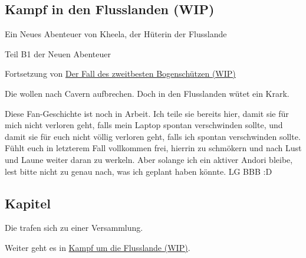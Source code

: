 \begin{chapterbox}
    \chapter{Kampf in den Flusslanden (WIP)}
    \label{wip-kampf-in-den-flusslanden}
    
    \begin{center}
        Ein Neues Abenteuer von Kheela, der Hüterin der Flusslande

        Teil B1 der Neuen Abenteuer

        Fortsetzung von \hyperref[wip-der-fall-des-zweitbesten-bogenschuetzen]{Der Fall des zweitbesten Bogenschützen (WIP)}
    \end{center}

    Die  wollen nach Cavern aufbrechen. Doch in den Flusslanden wütet ein Krark.
\end{chapterbox}




Diese Fan-Geschichte ist noch in Arbeit. Ich teile sie bereits hier, damit sie für mich nicht verloren geht, falls mein Laptop spontan verschwinden sollte, und damit sie für euch nicht völlig verloren geht, falls ich spontan verschwinden sollte. Fühlt euch in letzterem Fall vollkommen frei, hierrin zu schmökern und nach Lust und Laune weiter daran zu werkeln. Aber solange ich ein aktiver Andori bleibe, lest bitte nicht zu genau nach, was ich geplant haben könnte. LG BBB :D



\newpage
\section{Kapitel}

Die  trafen sich zu einer Versammlung.




\begin{commentbox}
    Weiter geht es in \hyperref[wip-kampf-um-die-flusslande]{Kampf um die Flusslande (WIP)}.
\end{commentbox}
